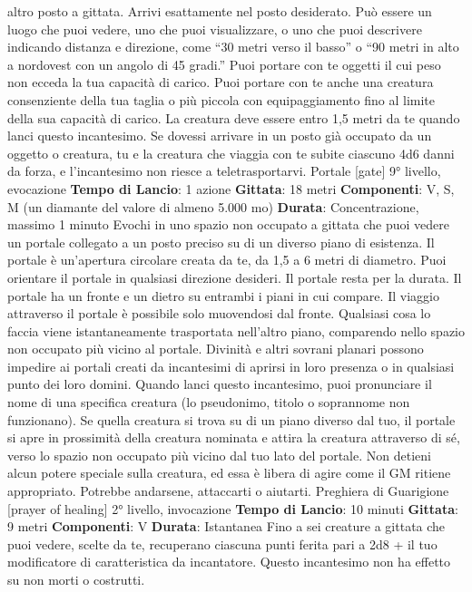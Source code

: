 \begin{multicols}{2}
altro posto a gittata. Arrivi esattamente nel posto
desiderato. Può essere un luogo che puoi vedere, uno
che puoi visualizzare, o uno che puoi descrivere
indicando distanza e direzione, come “30 metri verso il
basso” o “90 metri in alto a nordovest con un angolo di
45 gradi.”
Puoi portare con te oggetti il cui peso non ecceda la tua
capacità di carico. Puoi portare con te anche una
creatura consenziente della tua taglia o più piccola con
equipaggiamento fino al limite della sua capacità di
carico. La creatura deve essere entro 1,5 metri da te
quando lanci questo incantesimo.
Se dovessi arrivare in un posto già occupato da un
oggetto o creatura, tu e la creatura che viaggia con te
subite ciascuno 4d6 danni da forza, e l’incantesimo non
riesce a teletrasportarvi.
Portale
[gate]
9° livello, evocazione
\textbf{Tempo di Lancio}: 1 azione
\textbf{Gittata}: 18 metri
\textbf{Componenti}: V, S, M (un diamante del valore di
almeno 5.000 mo)
\textbf{Durata}: Concentrazione, massimo 1 minuto
Evochi in uno spazio non occupato a gittata che puoi
vedere un portale collegato a un posto preciso su di un
diverso piano di esistenza. Il portale è un’apertura
circolare creata da te, da 1,5 a 6 metri di diametro. Puoi
orientare il portale in qualsiasi direzione desideri. Il
portale resta per la durata.
Il portale ha un fronte e un dietro su entrambi i piani in
cui compare. Il viaggio attraverso il portale è possibile
solo muovendosi dal fronte. Qualsiasi cosa lo faccia
viene istantaneamente trasportata nell’altro piano,
comparendo nello spazio non occupato più vicino al
portale.
Divinità e altri sovrani planari possono impedire ai
portali creati da incantesimi di aprirsi in loro presenza o
in qualsiasi punto dei loro domini.
Quando lanci questo incantesimo, puoi pronunciare il
nome di una specifica creatura (lo pseudonimo, titolo o
soprannome non funzionano). Se quella creatura si
trova su di un piano diverso dal tuo, il portale si apre in
prossimità della creatura nominata e attira la creatura
attraverso di sé, verso lo spazio non occupato più vicino
dal tuo lato del portale. Non detieni alcun potere
speciale sulla creatura, ed essa è libera di agire come il
GM ritiene appropriato. Potrebbe andarsene, attaccarti
o aiutarti.
Preghiera di Guarigione
[prayer of healing]
2° livello, invocazione
\textbf{Tempo di Lancio}: 10 minuti
\textbf{Gittata}: 9 metri
\textbf{Componenti}: V
\textbf{Durata}: Istantanea
Fino a sei creature a gittata che puoi vedere, scelte da
te, recuperano ciascuna punti ferita pari a 2d8 + il tuo
modificatore di caratteristica da incantatore. Questo
incantesimo non ha effetto su non morti o costrutti.

\end{multicols}
